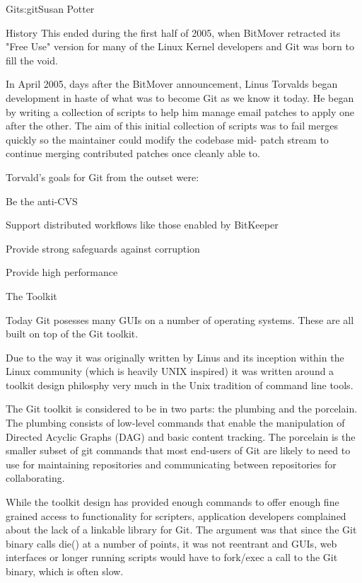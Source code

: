 \begin{aosachapter}{Git}{s:git}{Susan Potter}
\begin{aosasect1}{History}
This ended during the first half of 2005, when BitMover retracted its
"Free Use" version for many of the Linux Kernel developers and Git was born
to fill the void.

In April 2005, days after the BitMover announcement, Linus Torvalds began
development in haste of what was to become Git as we know it today. He began
by writing a collection of scripts to help him manage email patches
to apply one after the other. The aim of this initial collection of scripts
was to fail merges quickly so the maintainer could modify the codebase mid-
patch stream to continue merging contributed patches once cleanly able to.

Torvald's goals for Git from the outset were:
\begin{aosaitemize}
  \item Be the anti-CVS
  \item Support distributed workflows like those enabled by BitKeeper
  \item Provide strong safeguards against corruption
  \item Provide high performance
\end{aosaitemize}

\begin{aosasect1}{The Toolkit}

Today Git posesses many GUIs on a number of operating systems. These are
all built on top of the Git toolkit.

Due to the way it was originally written by Linus and its inception within
the Linux community (which is heavily UNIX inspired) it was written around
a toolkit design philosphy very much in the Unix tradition of command line
tools.

The Git toolkit is considered to be in two parts: the plumbing and
the porcelain. The plumbing consists of low-level commands that enable
the manipulation of Directed Acyclic Graphs (DAG) and basic content
tracking. The porcelain is the smaller subset of git commands that most
end-users of Git are likely to need to use for maintaining repositories and
communicating between repositories for collaborating.

While the toolkit design has provided enough commands to offer enough
fine grained access to functionality for scripters, application developers
complained about the lack of a linkable library for Git. The argument was
that since the Git binary calls die() at a number of points, it was not
reentrant and GUIs, web interfaces or longer running scripts would have
to fork/exec a call to the Git binary, which is often slow.


\end{aosasect1}
\end{aosasect1}
\end{aosachapter}
